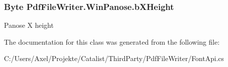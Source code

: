 \subsubsection[{\texorpdfstring{b\+X\+Height}{bXHeight}}]{\setlength{\rightskip}{0pt plus 5cm}Byte Pdf\+File\+Writer.\+Win\+Panose.\+b\+X\+Height\hspace{0.3cm}{\ttfamily [get]}}\hypertarget{class_pdf_file_writer_1_1_win_panose_aa066bd57eb9e751aaef1672f57322cfc}{}\label{class_pdf_file_writer_1_1_win_panose_aa066bd57eb9e751aaef1672f57322cfc}


Panose X height 



The documentation for this class was generated from the following file\+:\begin{DoxyCompactItemize}
\item 
C\+:/\+Users/\+Axel/\+Projekte/\+Catalist/\+Third\+Party/\+Pdf\+File\+Writer/Font\+Api.\+cs\end{DoxyCompactItemize}
